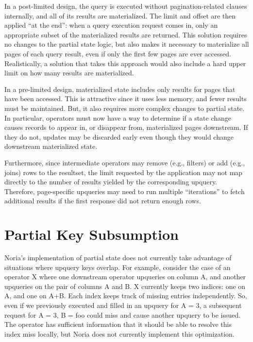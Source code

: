 In a post-limited design, the query is executed without pagination-related
clauses internally, and all of its results are materialized. The limit and
offset are then applied ``at the end'': when a query execution request comes in,
only an appropriate subset of the materialized results are returned. This
solution requires no changes to the partial state logic, but also makes it
necessary to materialize all pages of each query result, even if only the first
few pages are ever accessed. Realistically, a solution that takes this approach
would also include a hard upper limit on how many results are materialized.

In a pre-limited design, materialized state includes only results for pages that
have been accessed. This is attractive since it uses less memory, and fewer
results must be maintained. But, it also requires more complex changes to
partial state. In particular, operators must now have a way to determine if a
state change causes records to appear in, or disappear from, materialized pages
downstream. If they do not, updates may be discarded early even though they
would change downstream materialized state.

Furthermore, since intermediate operators may remove (e.g., filters) or add
(e.g., joins) rows to the resultset, the limit requested by the application may
not map directly to the number of results yielded by the corresponding upquery.
Therefore, page-specific upqueries may need to run multiple ``iterations'' to
fetch additional results if the first response did not return enough rows.

\section{Partial Key Subsumption}

Noria's implementation of partial state does not currently take advantage of
situations where upquery keys overlap. For example, consider the case of an
operator X where one downstream operator upqueries on column A, and another
upqueries on the pair of columns A and B. X currently keeps two indices: one on
A, and one on A+B. Each index keeps track of missing entries independently. So,
even if we previously executed and filled in an upquery for A = 3, a subsequent
request for A = 3, B = foo could miss and cause another upquery to be issued.
The operator has sufficient information that it should be able to resolve this
index miss locally, but Noria does not currently implement this optimization.
